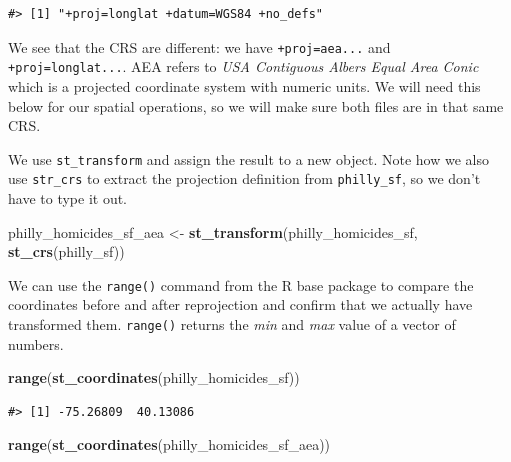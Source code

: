 \documentclass[
]{book}
\newenvironment{Shaded}{\begin{snugshade}}{\end{snugshade}}
\newcommand{\FunctionTok}[1]{\textcolor[rgb]{0.13,0.29,0.53}{\textbf{#1}}}
\newcommand{\NormalTok}[1]{#1}
\newcommand{\OtherTok}[1]{\textcolor[rgb]{0.56,0.35,0.01}{#1}}
\newcommand{\SpecialCharTok}[1]{\textcolor[rgb]{0.81,0.36,0.00}{\textbf{#1}}}
\begin{document}
\begin{Shaded}
\end{Shaded}

\begin{verbatim}
#> [1] "+proj=longlat +datum=WGS84 +no_defs"
\end{verbatim}

We see that the CRS are different: we have \texttt{+proj=aea...} and \texttt{+proj=longlat...}. AEA refers to \emph{USA Contiguous Albers Equal Area Conic} which is a projected coordinate system with numeric units. We will need this below for our spatial operations, so we will make sure both files are in that same CRS.

We use \texttt{st\_transform} and assign the result to a new object. Note how we also use \texttt{str\_crs} to extract the projection definition from \texttt{philly\_sf}, so we don't have to type it out.

\begin{Shaded}
\begin{Highlighting}[]
\NormalTok{philly\_homicides\_sf\_aea }\OtherTok{\textless{}{-}} \FunctionTok{st\_transform}\NormalTok{(philly\_homicides\_sf, }\FunctionTok{st\_crs}\NormalTok{(philly\_sf))}
\end{Highlighting}
\end{Shaded}

We can use the \texttt{range()} command from the R base package to compare the coordinates before and after reprojection and confirm that we actually have transformed them. \texttt{range()} returns the \emph{min} and \emph{max} value of a vector of numbers.

\begin{Shaded}
\begin{Highlighting}[]
\FunctionTok{range}\NormalTok{(}\FunctionTok{st\_coordinates}\NormalTok{(philly\_homicides\_sf))}
\end{Highlighting}
\end{Shaded}

\begin{verbatim}
#> [1] -75.26809  40.13086
\end{verbatim}

\begin{Shaded}
\begin{Highlighting}[]
\FunctionTok{range}\NormalTok{(}\FunctionTok{st\_coordinates}\NormalTok{(philly\_homicides\_sf\_aea))}
\end{Highlighting}
\end{Shaded}
\end{document}
